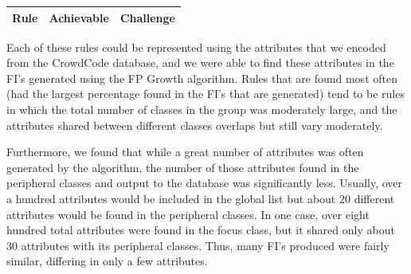 \documentclass[12pt]{article}
\begin{document}
\begin{table}[H]
\centering
\begin{tabular}{| >{\centering\arraybackslash}m{5.5cm} | >{\centering\arraybackslash}m{4.5cm} | >{\centering\arraybackslash}m{5.5cm} |}
\hline
Rule & Achievable & Challenge \\ \hline
\end{tabular}

Each of these rules could be represented using the attributes that we encoded from the CrowdCode database, and we were able to find these attributes in the FI's generated using the FP Growth algorithm. Rules that are found most often (had the largest percentage found in the FI's that are generated) tend to be rules in which the total number of classes in the group was moderately large, and the attributes shared between different classes overlaps but still vary moderately. 

Furthermore, we found that while a great number of attributes was often generated by the algorithm, the number of those attributes found in the peripheral classes and output to the database was significantly less. Usually, over a hundred attributes would be included in the global list but about 20 different attributes would be found in the peripheral classes. In one case, over eight hundred total attributes were found in the focus class, but it shared only about 30 attributes with its peripheral classes. Thus, many FI's produced were fairly similar, differing in only a few attributes.





\end{table}
\end{document}
